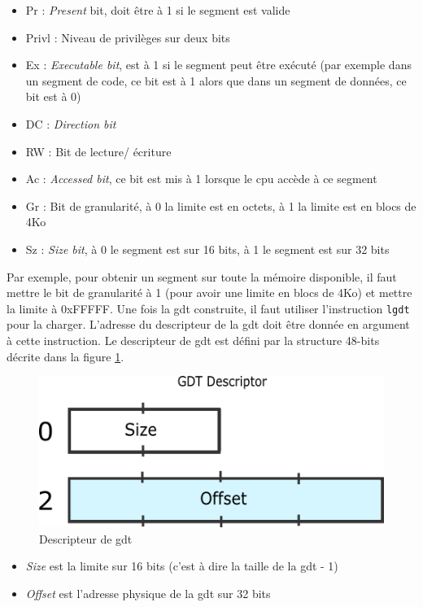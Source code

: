 \begin{itemize}[label=\textbullet]
	\item Pr : \textit{Present} bit, doit être à 1 si le segment est valide
	\item Privl : Niveau de privilèges sur deux bits
	\item Ex : \textit{Executable bit}, est à 1 si le segment peut être exécuté
    (par exemple dans un segment de code, ce bit est à 1 alors que dans un segment
    de données, ce bit est à 0)
    \item DC : \textit{Direction bit}
    \item RW : Bit de lecture/ écriture
    \item Ac : \textit{Accessed bit}, ce bit est mis à 1 lorsque le \acrshort{cpu}
    accède à ce segment
    \item Gr : Bit de granularité, à 0 la limite est en octets, à 1 la limite est en blocs
    de 4Ko
    \item Sz : \textit{Size bit}, à 0 le segment est sur 16 bits, à 1 le segment
    est sur 32 bits
\end{itemize}

Par exemple, pour obtenir un segment sur toute la mémoire disponible, il faut mettre
le bit de granularité à 1 (pour avoir une limite en blocs de 4Ko) et mettre la
limite à 0xFFFFF. Une fois la \acrshort{gdt} construite, il faut utiliser l'instruction
\texttt{lgdt} pour la charger. L'adresse du descripteur de la \acrshort{gdt}
doit être donnée en argument à cette instruction. Le descripteur de \acrshort{gdt}
est défini par la structure 48-bits décrite dans la figure \ref{gdt_descriptor}.\cite{ref14}

\begin{figure}[!h]
  \centering
  \includegraphics[scale=0.5]{images/gdt_descriptor.png}
  \caption{Descripteur de \acrshort{gdt}}
  \label{gdt_descriptor}
\end{figure}

\begin{itemize}[label=\textbullet]
	\item \textit{Size} est la limite sur 16 bits (c'est à dire la taille de la
    \acrshort{gdt} - 1)
	\item \textit{Offset} est l'adresse physique de la \acrshort{gdt} sur 32 bits
\end{itemize}

